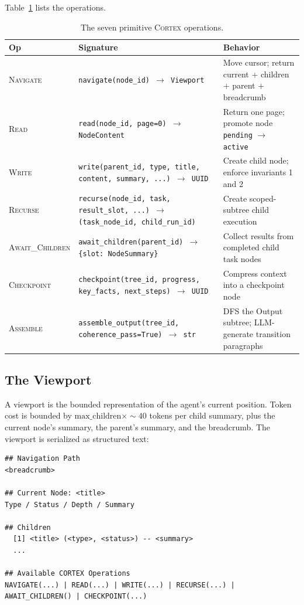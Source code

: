 \documentclass[11pt,a4paper]{article}
\theoremstyle{cortexprop}
\newcommand{\op}[1]{\textsc{#1}}
\newcommand{\code}[1]{\texttt{#1}}
\begin{document}
Table~\ref{tab:ops} lists the operations.

\begin{table}[h]
\centering
\caption{The seven primitive \textsc{Cortex} operations.}
\label{tab:ops}
\small
\begin{tabularx}{\linewidth}{lXX}
\toprule
\textbf{Op} & \textbf{Signature} & \textbf{Behavior}\\
\midrule
\op{Navigate} & \code{navigate(node\_id) $\to$ Viewport} & Move cursor; return current + children + parent + breadcrumb \\
\op{Read} & \code{read(node\_id, page=0) $\to$ NodeContent} & Return one page; promote node \code{pending} $\to$ \code{active} \\
\op{Write} & \code{write(parent\_id, type, title, content, summary, ...) $\to$ UUID} & Create child node; enforce invariants 1 and 2 \\
\op{Recurse} & \code{recurse(node\_id, task, result\_slot, ...) $\to$ (task\_node\_id, child\_run\_id)} & Create scoped-subtree child execution \\
\op{Await\_Children} & \code{await\_children(parent\_id) $\to$ \{slot: NodeSummary\}} & Collect results from completed child task nodes \\
\op{Checkpoint} & \code{checkpoint(tree\_id, progress, key\_facts, next\_steps) $\to$ UUID} & Compress context into a checkpoint node \\
\op{Assemble} & \code{assemble\_output(tree\_id, coherence\_pass=True) $\to$ str} & DFS the Output subtree; LLM-generate transition paragraphs \\
\bottomrule
\end{tabularx}
\end{table}

\subsection{The Viewport}

A viewport is the bounded representation of the agent's current position.
Token cost is bounded by $\text{max\_children} \times {\sim}40$ tokens per
child summary, plus the current node's summary, the parent's summary, and
the breadcrumb. The viewport is serialized as structured text:

\begin{lstlisting}[basicstyle=\ttfamily\scriptsize]
## Navigation Path
<breadcrumb>

## Current Node: <title>
Type / Status / Depth / Summary

## Children
  [1] <title> (<type>, <status>) -- <summary>
  ...

## Available CORTEX Operations
NAVIGATE(...) | READ(...) | WRITE(...) | RECURSE(...) |
AWAIT_CHILDREN() | CHECKPOINT(...)
\end{lstlisting}
\end{document}
